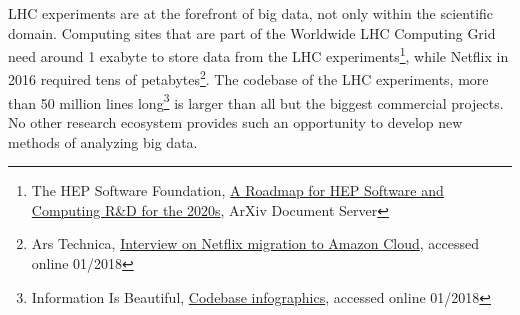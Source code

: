 LHC experiments are at the forefront of big data, not only within the scientific domain.
Computing sites that are part of the Worldwide LHC Computing Grid need around 1 exabyte to store data from the LHC experiments\footnote{The HEP Software Foundation, \href{https://arxiv.org/pdf/1712.06982.pdf}{A Roadmap for HEP Software and Computing R\&D for the 2020s}, ArXiv Document Server}, while Netflix in 2016 required 
tens of petabytes\footnote{Ars Technica, \href{https://arstechnica.com/information-technology/2016/02/netflix-finishes-its-massive-migration-to-the-amazon-cloud/}{Interview on Netflix migration to Amazon Cloud}, accessed online 01/2018}. 
The codebase of the LHC experiments, more than 50 million lines long\footnote{Information Is Beautiful, \href{http://www.informationisbeautiful.net/visualizations/million-lines-of-code/}{Codebase infographics}, accessed online 01/2018} is larger than all but the biggest commercial projects.  
No other research ecosystem provides such an opportunity to develop new methods of analyzing big data. 


